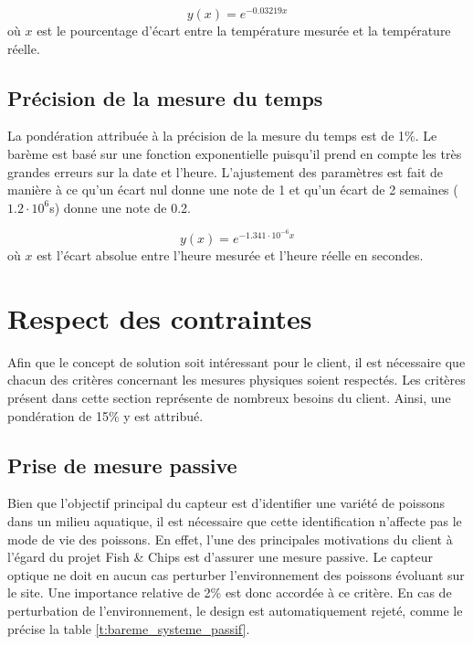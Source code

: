 \begin{equation}
    y(x) = e^{-0.03219x}
    \label{eq:bareme_precision_temperature}
\end{equation}
où $x$ est le pourcentage d'écart entre la température mesurée et la température réelle.

\subsection{Précision de la mesure du temps}

La pondération attribuée à la précision de la mesure du temps est de 1$\%$. Le barème est basé sur une fonction exponentielle puisqu'il prend en compte les très grandes erreurs sur la date et l'heure. L'ajustement des paramètres est fait de manière à ce qu'un écart nul donne une note de 1 et qu'un écart de 2 semaines ($1.2\cdot 10^6$s) donne une note de 0.2.

\begin{equation}
    y(x) = e^{-1.341\cdot10^{-6}x}
    \label{eq:bareme_precision_temps}
\end{equation}
où $x$ est l'écart absolue entre l'heure mesurée et l'heure réelle en secondes.

\section{Respect des contraintes}

Afin que le concept de solution soit intéressant pour le client, il est nécessaire que chacun des critères concernant les mesures physiques soient respectés. Les critères présent dans cette section représente de nombreux besoins du client. Ainsi, une pondération de 15\% y est attribué. 

\subsection{Prise de mesure passive}

Bien que l'objectif principal du capteur est d'identifier une variété de poissons dans un milieu aquatique, il est nécessaire que cette identification n'affecte pas le mode de vie des poissons. En effet, l'une des principales motivations du client à l'égard du projet Fish \& Chips est d'assurer une mesure passive. Le capteur optique ne doit en aucun cas perturber l'environnement des poissons évoluant sur le site. Une importance relative de 2\% est donc accordée à ce critère. En cas de perturbation de l'environnement, le design est automatiquement rejeté, comme le précise la table \ref{t:bareme_systeme_passif}.

